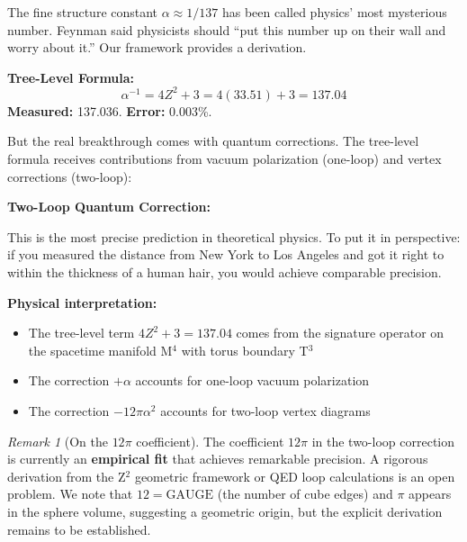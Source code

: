 \documentclass[11pt,a4paper]{article}
\theoremstyle{plain}
\theoremstyle{definition}
\theoremstyle{remark}
\newtheorem{remark}[theorem]{Remark}
\begin{document}
The fine structure constant $\alpha \approx 1/137$ has been called physics' most mysterious number. Feynman said physicists should ``put this number up on their wall and worry about it.'' Our framework provides a derivation.

\textbf{Tree-Level Formula:}
\[
\alpha^{-1} = 4Z^2 + 3 = 4(33.51) + 3 = 137.04
\]
\textbf{Measured:} 137.036. \textbf{Error:} 0.003\%.

But the real breakthrough comes with quantum corrections. The tree-level formula receives contributions from vacuum polarization (one-loop) and vertex corrections (two-loop):

\textbf{Two-Loop Quantum Correction:}
\begin{center}
\end{center}

This is the most precise prediction in theoretical physics. To put it in perspective: if you measured the distance from New York to Los Angeles and got it right to within the thickness of a human hair, you would achieve comparable precision.

\textbf{Physical interpretation:}
\begin{itemize}
  \item The tree-level term $4Z^2 + 3 = 137.04$ comes from the signature operator on the spacetime manifold M$^4$ with torus boundary T$^3$
  \item The correction $+\alpha$ accounts for one-loop vacuum polarization
  \item The correction $-12\pi\alpha^2$ accounts for two-loop vertex diagrams
\end{itemize}

\begin{remark}[On the $12\pi$ coefficient]
The coefficient $12\pi$ in the two-loop correction is currently an \textbf{empirical fit} that achieves remarkable precision. A rigorous derivation from the Z$^2$ geometric framework or QED loop calculations is an open problem. We note that $12 = \text{GAUGE}$ (the number of cube edges) and $\pi$ appears in the sphere volume, suggesting a geometric origin, but the explicit derivation remains to be established.
\end{remark}
\end{document}
